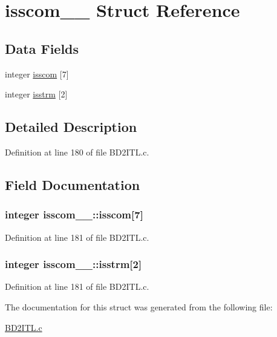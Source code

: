 \hypertarget{structisscom__1__}{}\section{isscom\+\_\+\_\+ Struct Reference}
\label{structisscom__1__}
\subsection*{Data Fields}
\begin{DoxyCompactItemize}
\item 
integer \hyperlink{structisscom__1___ae335d37f10e65fc3ac7a1c2fec8ac090}{isscom} \mbox{[}7\mbox{]}
\item 
integer \hyperlink{structisscom__1___a132a750ec5af77a6bf623b9007e8165e}{isstrm} \mbox{[}2\mbox{]}
\end{DoxyCompactItemize}


\subsection{Detailed Description}


Definition at line 180 of file B\+D2\+I\+T\+L.\+c.



\subsection{Field Documentation}
\subsubsection[{\texorpdfstring{isscom}{isscom}}]{\setlength{\rightskip}{0pt plus 5cm}integer isscom\+\_\+\_\+\+::isscom\mbox{[}7\mbox{]}}\hypertarget{structisscom__1___ae335d37f10e65fc3ac7a1c2fec8ac090}{}\label{structisscom__1___ae335d37f10e65fc3ac7a1c2fec8ac090}


Definition at line 181 of file B\+D2\+I\+T\+L.\+c.

\subsubsection[{\texorpdfstring{isstrm}{isstrm}}]{\setlength{\rightskip}{0pt plus 5cm}integer isscom\+\_\+\_\+\+::isstrm\mbox{[}2\mbox{]}}\hypertarget{structisscom__1___a132a750ec5af77a6bf623b9007e8165e}{}\label{structisscom__1___a132a750ec5af77a6bf623b9007e8165e}


Definition at line 181 of file B\+D2\+I\+T\+L.\+c.



The documentation for this struct was generated from the following file\+:\begin{DoxyCompactItemize}
\item 
\hyperlink{BD2ITL_8c}{B\+D2\+I\+T\+L.\+c}\end{DoxyCompactItemize}
